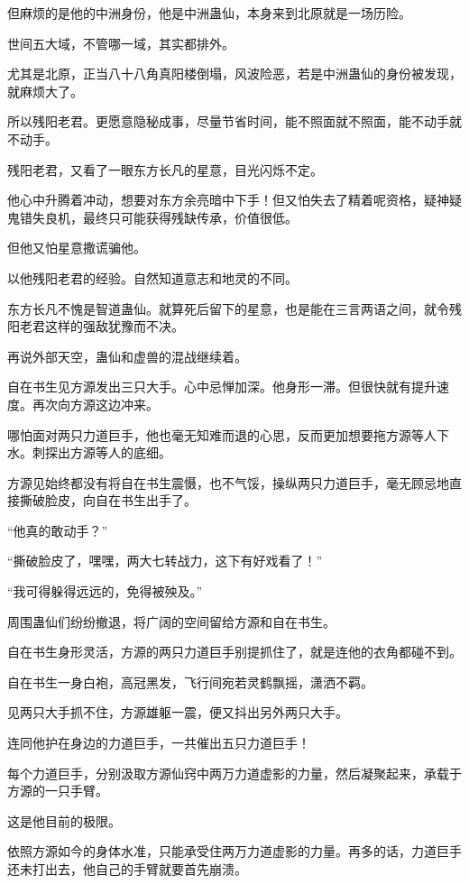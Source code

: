 \begin{this_body}
但麻烦的是他的中洲身份，他是中洲蛊仙，本身来到北原就是一场历险。

世间五大域，不管哪一域，其实都排外。

尤其是北原，正当八十八角真阳楼倒塌，风波险恶，若是中洲蛊仙的身份被发现，就麻烦大了。

所以残阳老君。更愿意隐秘成事，尽量节省时间，能不照面就不照面，能不动手就不动手。

残阳老君，又看了一眼东方长凡的星意，目光闪烁不定。

他心中升腾着冲动，想要对东方余亮暗中下手！但又怕失去了精着呢资格，疑神疑鬼错失良机，最终只可能获得残缺传承，价值很低。

但他又怕星意撒谎骗他。

以他残阳老君的经验。自然知道意志和地灵的不同。

东方长凡不愧是智道蛊仙。就算死后留下的星意，也是能在三言两语之间，就令残阳老君这样的强敌犹豫而不决。

再说外部天空，蛊仙和虚兽的混战继续着。

自在书生见方源发出三只大手。心中忌惮加深。他身形一滞。但很快就有提升速度。再次向方源这边冲来。

哪怕面对两只力道巨手，他也毫无知难而退的心思，反而更加想要拖方源等人下水。刺探出方源等人的底细。

方源见始终都没有将自在书生震慑，也不气馁，操纵两只力道巨手，毫无顾忌地直接撕破脸皮，向自在书生出手了。

“他真的敢动手？”

“撕破脸皮了，嘿嘿，两大七转战力，这下有好戏看了！”

“我可得躲得远远的，免得被殃及。”

周围蛊仙们纷纷撤退，将广阔的空间留给方源和自在书生。

自在书生身形灵活，方源的两只力道巨手别提抓住了，就是连他的衣角都碰不到。

自在书生一身白袍，高冠黑发，飞行间宛若灵鹤飘摇，潇洒不羁。

见两只大手抓不住，方源雄躯一震，便又抖出另外两只大手。

连同他护在身边的力道巨手，一共催出五只力道巨手！

每个力道巨手，分别汲取方源仙窍中两万力道虚影的力量，然后凝聚起来，承载于方源的一只手臂。

这是他目前的极限。

依照方源如今的身体水准，只能承受住两万力道虚影的力量。再多的话，力道巨手还未打出去，他自己的手臂就要首先崩溃。


\end{this_body}
